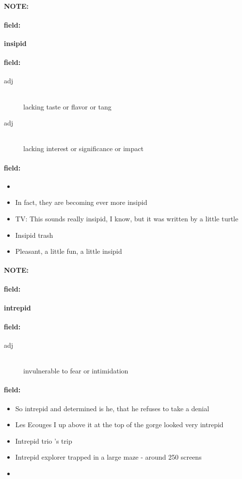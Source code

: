 \documentclass[12pt]{article}
\newenvironment{note}{\paragraph{NOTE:}}{}
\newenvironment{field}{\paragraph{field:}}{}
\begin{document}
\begin{note}
\begin{field}
\textbf{\large insipid}
\end{field}


\begin{field}
\begin{description}
\item[adj] \hfill \\ 
lacking taste or flavor or tang

\item[adj] \hfill \\ 
lacking interest or significance or impact

\end{description}
\end{field}

\begin{field}
\begin{itemize}
\item 
\item In fact, they are becoming ever more insipid
\item TV: This sounds really insipid, I know, but it was written by a little turtle
\item Insipid trash
\item Pleasant, a little fun, a little insipid
\end{itemize}
\end{field}
\end{note}
\begin{note}
\begin{field}
\textbf{\large intrepid}
\end{field}


\begin{field}
\begin{description}
\item[adj] \hfill \\ 
invulnerable to fear or intimidation

\end{description}
\end{field}

\begin{field}
\begin{itemize}
\item So intrepid and determined is he, that he refuses to take a denial
\item Les Ecouges I up above it at the top of the gorge looked very intrepid
\item Intrepid trio 's trip
\item Intrepid explorer trapped in a large maze - around 250 screens
\item 
\end{itemize}
\end{field}
\end{note}
\end{document}
